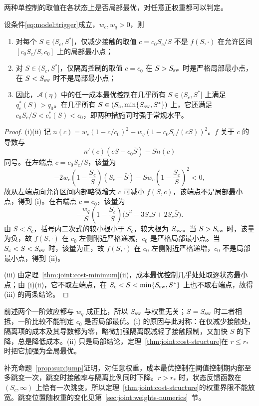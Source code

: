 两种单控制的取值在各状态上是否局部最优，对任意正权重都可以判定。
\begin{proposition}
\label{prop:joint:global-structure}
设条件\eqref{eq:model:trigger}成立，$w_c,w_q>0$，则
\begin{enumerate}
\renewcommand{\labelenumi}{(\roman{enumi})}
\item 对每个 $S\in(S_c,S^*]$，仅减少接触的取值 $c=c_0S_c/S$ 不是 $f(S,\cdot)$ 在允许区间 $[c_0S_c/S,c_0]$ 上的局部最小点；
\item 对 $S\in(S_c,S^*]$，仅隔离控制的取值 $c=c_0$ 在 $S>S_{\rm sw}$ 时是严格局部最小点，在 $S<S_{\rm sw}$ 时不是局部最小点；
\item 因此，$\mathcal A(\eta)$ 中的任一成本最优控制在几乎所有 $S\in(S_c,S^*]$ 上满足 $q_c^*(S)>q_0$。在几乎所有 $S\in(S_c,\min\{S_{\rm sw},S^*\})$ 上，它还满足 $c_0S_c/S<c_c^*(S)<c_0$，即两种措施同时强于常规水平。
\end{enumerate}
\end{proposition}
\begin{proof}
(i)(ii) 记 $n(c)=w_c(1-c/c_0)^2+w_q(1-c_0S_c/(cS))^2$。$f$ 关于 $c$ 的导数与
\[
n'(c)(cS-c_0\bar S)-S n(c)
\]
同号。在左端点 $c=c_0S_c/S$，该量为
\[
-2w_c\left(1-\frac{S_c}{S}\right)(S_c-\bar S)
-Sw_c\left(1-\frac{S_c}{S}\right)^2<0,
\]
故从左端点向允许区间内部略微增大 $c$ 可减小 $f(S,c)$，该端点不是局部最小点，得到 (i)。在右端点 $c=c_0$，该量为
\[
-\frac{w_q}{S}\left(1-\frac{S_c}{S}\right)
\bigl(S^2-3S_cS+2S_c\bar S\bigr).
\]
由 $\bar S<S_c$，括号内二次式的较小根小于 $S_c$，较大根为 $S_{\rm sw}$。当 $S>S_{\rm sw}$ 时，该量为负，故 $f(S,\cdot)$ 在 $c_0$ 左侧附近严格递减，$c_0$ 是严格局部最小点。当 $S_c<S<S_{\rm sw}$ 时，该量为正，故 $f(S,\cdot)$ 在 $c_0$ 左侧附近严格递增，$c_0$ 不是局部最小点，得到 (ii)。

(iii) 由定理~\ref{thm:joint:cost-minimum}(ii)，成本最优控制几乎处处取逐状态最小点；由 (i)(ii)，它不取左端点，在 $S_c<S<\min\{S_{\rm sw},S^*\}$ 上也不取右端点，故得 (iii) 的两条结论。
\end{proof}
前述两个一阶效应都与 $w_q$ 成正比，所以 $S_{\rm sw}$ 与权重无关；$S=S_{\rm sw}$ 时二者相抵，一阶比较不能判定 $c_0$ 是否局部最优。(i) 的原因与此对称：在仅减少接触处，隔离项的成本及其导数都为零，略微加强隔离既减轻了接触限制，又加快 $S$ 的下降，总是降低成本。(ii) 只是局部结论，定理~\ref{thm:joint:cost-structure}在 $r\le r_*$ 时把它加强为全局最优。

补充命题~\ref*{prop:sup:jump}证明，对任意权重，成本最优控制在阈值控制期内部至多跳变一次，跳变时接触率与隔离比例同时下降。$r>r_*$ 时，状态反馈函数在 $(S_c,\infty)$ 上恰有一次跳变，所以定理~\ref{thm:joint:cost-structure}的权重界限不能放宽。跳变位置随权重的变化见第~\ref{sec:joint:weights-numerics}~节。

